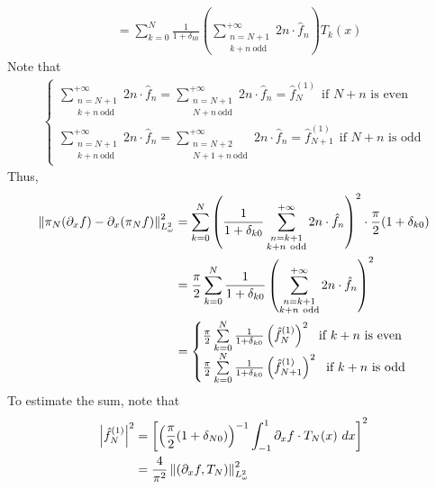 \documentclass[a4paper,8pt]{article}
\begin{document}
\begin{enumerate}[label=Q\arabic	*.]
\begin{enumerate}[label=(\alph*)]
\begin{align}
&= \sum\limits^{N}_{k=0} \frac{1}{1 + \delta_{k0}} \left(\sum\limits^{+ \infty}_{\substack{n = N+1 \\ k + n \ \text{odd}}} 2n \cdot \hat{f}_n \right) T_k(x) \nonumber
\end{align}
Note that
\begin{align}
\begin{cases}
\sum\limits^{+ \infty}_{\substack{n = N+1 \\ k + n \ \text{odd}}} 2n \cdot \hat{f}_n = \sum\limits^{+ \infty}_{\substack{n = N+1 \\ N + n \ \text{odd}}} 2n \cdot \hat{f}_n = \hat{f}^{(1)}_N \ \ \text{if $N+n$ is even} \\
\sum\limits^{+ \infty}_{\substack{n = N+1 \\ k + n \ \text{odd}}} 2n \cdot \hat{f}_n = \sum\limits^{+ \infty}_{\substack{n = N+2 \\ N + 1 + n \ \text{odd}}} 2n \cdot \hat{f}_n = \hat{f}^{(1)}_{N+1} \ \ \text{if $N+n$ is odd}
\end{cases} \nonumber
\end{align}
Thus,
\begin{align}
\left\lVert\pi_N(\partial_x f) - \partial_x(\pi_Nf)\right\rVert^2_{L^2_{\omega}} &= \sum\limits_{k=0}^N \left(\frac{1}{1+\delta_{k0}} \sum\limits^{+\infty}_{\substack{n = k+1 \\ k + n \ \text{odd}}} 2n \cdot \hat{f}_n \right)^2 \cdot \frac{\pi}{2}(1+\delta_{k0}) \nonumber \\
&= \frac{\pi}{2} \sum\limits_{k=0}^N \frac{1}{1+\delta_{k0}} \left(\sum\limits^{+\infty}_{\substack{n = k+1 \\ k + n \ \text{odd}}} 2n \cdot \hat{f}_n \right)^2 \nonumber \\
&= 
\begin{cases}
\frac{\pi}{2} \sum\limits_{k=0}^N \frac{1}{1 + \delta_{k0}} \left(\hat{f}^{(1)}_N \right) ^2 \ \ \text{if $k+n$ is even} \\
\frac{\pi}{2} \sum\limits_{k=0}^N \frac{1}{1 + \delta_{k0}} \left(\hat{f}^{(1)}_{N+1} \right) ^2 \ \ \text{if $k+n$ is odd}
\end{cases} \nonumber
\end{align}
To estimate the sum, note that
\begin{align}
\abs{\hat{f}^{(1)}_N}^2 &= \left[ \left(\frac{\pi}{2} (1+\delta_{N0}) \right)^{-1} \int_{-1}^1 \partial_x f \cdot T_N(x) \ dx \right]^2 \nonumber \\
&= \frac{4}{\pi^2} \norm{(\partial_x f, T_N)}^2_{L^2_{\omega}} \nonumber \\

\end{align}
\end{enumerate}
\end{enumerate}
\end{document}

